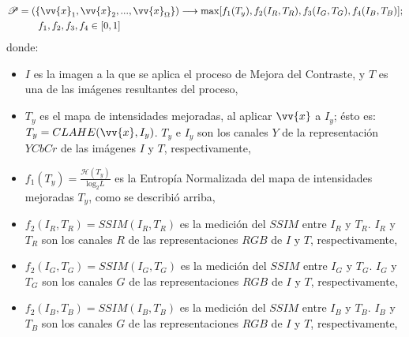 \begin{equation}
\begin{split}
\mathscr{P} &= (\{\vv{x}_1, \vv{x}_2,...,\vv{x}_{\Omega}\}) \longrightarrow \text{max}[f_1(T_y),f_2(I_R,T_R),f_3(I_G,T_G),f_4(I_B,T_B)]; \\
            & \qquad f_1,f_2,f_3,f_4 \in [0,1]
\end{split}
\end{equation}
donde:


\begin{itemize}
        \item $I$ es la imagen a la que se aplica el proceso de Mejora del Contraste, y $T$\label{symbol:imejorada} es una de las imágenes resultantes del proceso,
	\item $T_y$ es el mapa de intensidades mejoradas, al aplicar $\vv{x}$ a $I_y$; ésto es: $T_y=CLAHE(\vv{x},I_y\label{symbol:ioriginaly})$. $T_y$ e $I_y$ son los canales $Y$ de la representación $YCbCr$  de las imágenes $I$ y $T$, respectivamente,
	\item $f_1(T_y)\label{symbol:imejoraday}=\frac{\mathscr{H}(T_y)}{\text{log}_2L}$ es la Entropía Normalizada del mapa de intensidades mejoradas $T_y$, como se describió arriba,
	\item $f_2(I_R\label{symbol:ioriginalr},T_R\label{symbol:imejoradar})=SSIM(I_R,T_R)$ es la medición del $SSIM$ entre $I_R$ y $T_R$. $I_R$ y $T_R$ son los canales $R$ de las representaciones $RGB$ de $I$ y $T$, respectivamente,
	\item $f_2(I_G\label{symbol:ioriginalg},T_G\label{symbol:imejoradag})=SSIM(I_G,T_G)$ es la medición del $SSIM$ entre $I_G$ y $T_G$. $I_G$ y $T_G$ son los canales $G$ de las representaciones $RGB$ de $I$ y $T$, respectivamente,
	\item $f_2(I_B\label{symbol:ioriginalb},T_B\label{symbol:imejoradab})=SSIM(I_B,T_B)$ es la medición del $SSIM$ entre $I_B$ y $T_B$. $I_B$ y $T_B$ son los canales $G$ de las representaciones $RGB$ de $I$ y $T$, respectivamente,
\end{itemize}

